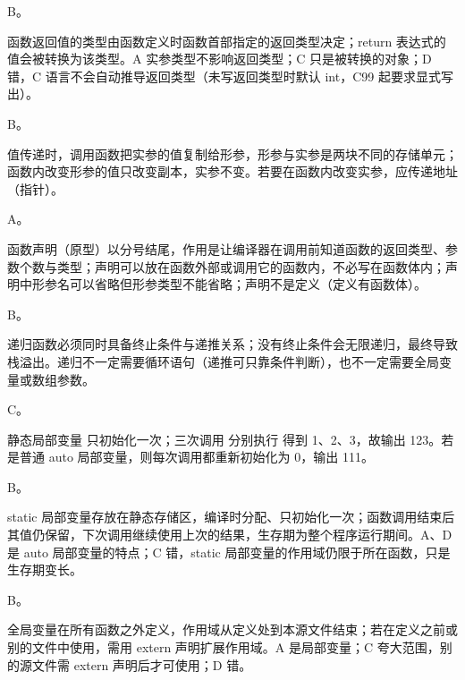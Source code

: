 \documentclass[a4paper,11pt]{article}
\begin{document}


\q B。\begin{analysis}函数返回值的类型由函数定义时函数首部指定的返回类型决定；return 表达式的值会被转换为该类型。A 实参类型不影响返回类型；C 只是被转换的对象；D 错，C 语言不会自动推导返回类型（未写返回类型时默认 int，C99 起要求显式写出）。\end{analysis}

\q B。\begin{analysis}值传递时，调用函数把实参的值复制给形参，形参与实参是两块不同的存储单元；函数内改变形参的值只改变副本，实参不变。若要在函数内改变实参，应传递地址（指针）。\end{analysis}

\q A。\begin{analysis}函数声明（原型）以分号结尾，作用是让编译器在调用前知道函数的返回类型、参数个数与类型；声明可以放在函数外部或调用它的函数内，不必写在函数体内；声明中形参名可以省略但形参类型不能省略；声明不是定义（定义有函数体）。\end{analysis}

\q B。\begin{analysis}递归函数必须同时具备终止条件与递推关系；没有终止条件会无限递归，最终导致栈溢出。递归不一定需要循环语句（递推可只靠条件判断），也不一定需要全局变量或数组参数。\end{analysis}

\q C。\begin{analysis}静态局部变量  只初始化一次；三次调用  分别执行  得到 1、2、3，故输出 123。若  是普通 auto 局部变量，则每次调用都重新初始化为 0，输出 111。\end{analysis}

\q B。\begin{analysis}static 局部变量存放在静态存储区，编译时分配、只初始化一次；函数调用结束后其值仍保留，下次调用继续使用上次的结果，生存期为整个程序运行期间。A、D 是 auto 局部变量的特点；C 错，static 局部变量的作用域仍限于所在函数，只是生存期变长。\end{analysis}

\q B。\begin{analysis}全局变量在所有函数之外定义，作用域从定义处到本源文件结束；若在定义之前或别的文件中使用，需用 extern 声明扩展作用域。A 是局部变量；C 夸大范围，别的源文件需 extern 声明后才可使用；D 错。\end{analysis}
\end{document}
